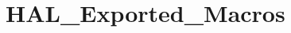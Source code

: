 \hypertarget{group___h_a_l___exported___macros}{}\section{H\+A\+L\+\_\+\+Exported\+\_\+\+Macros}
\label{group___h_a_l___exported___macros}
